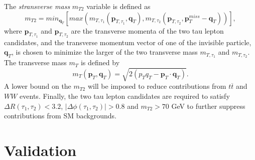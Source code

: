 \documentclass{ws-mpla}
\begin{document}
The \textit{stransverse mass} $m_{T2}$ variable is defined as
\begin{equation}
m_{T2} =min_{\mathbf{q}_T}
\left[
max(m_{T,\tau_1}(\mathbf{p}_{T,\tau_1},\mathbf{q}_T),m_{T,\tau_2}(\mathbf{p}_{T,\tau_2},\mathbf{p}^{miss}_T -\mathbf{q}_T))
\right],
\end{equation}   
where $\mathbf{p}_{T,\tau_1}$ and $\mathbf{p}_{T,\tau_2}$ are the transverse momenta of the two tau lepton candidates, and the transverse momentum vector of one of the invisible particle, $\mathbf{q}_T$, is chosen to minimize the larger of the two transverse mass $m_{T,\tau_1}$ and $m_{T,\tau_2}$. The transverse mass $m_T$ is defined by
\begin{equation}
m_{T}(\mathbf{p}_T,\mathbf{q}_T) = \sqrt{2(p_T q_T -\mathbf{p}_T\cdot\mathbf{q}_T)}.
\end{equation} 
A lower bound on the $m_{T2}$ will be imposed to reduce contributions from $t\overline{t}$ and $WW$ events.
Finally, the two tau lepton candidates are required to satisfy $\Delta R(\tau_1,\tau_2) < 3.2$, $|\Delta\phi (\tau_1,\tau_2)| > 0.8$ and $m_{T2} > 70$ GeV to further suppress contributions from SM backgrounds.




\section{Validation}
\end{document}
